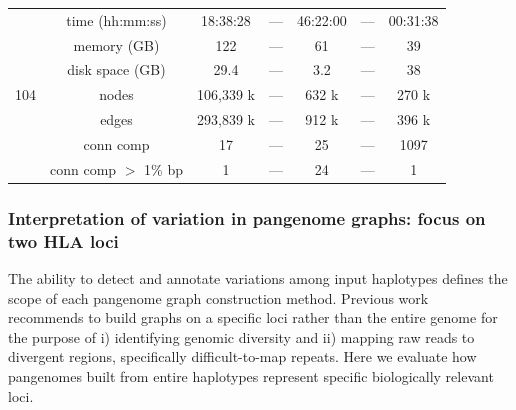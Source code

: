 \begin{table}
{\begin{tabular}{|c c c c c c c|}
			\hline\hline
			\multirow{7}{*}{104}  & time (hh:mm:ss)  &  18:38:28   &  ---  & 46:22:00  & --- & 00:31:38\\
			\cline{2-7}
			& memory (GB) & 122 &  ---  &  61 & --- & 39\\
			\cline{2-7}
			& disk space (GB)  &  29.4  & ---  &  3.2 & --- & 38\\
			\cline{2-7}
			&  nodes  & 106,339 k  &  ---  & 632 k & --- & 270 k\\
			\cline{2-7}
			&  edges  & 293,839 k  &  ---    & 912 k & --- & 396 k\\
			\cline{2-7}
			& conn comp   &  17  &   ---  & 25  & --- & 1097\\
			\cline{2-7}
			& conn comp $>$ 1\% bp &  1   & --- & 24 & --- & 1\\
			
			\hline
	\end{tabular}}
	\label{tab:computational_metrics}
\end{table}

\subsubsection*{\textbf{Interpretation of variation in pangenome graphs: focus on two HLA loci}}
\label{sec:loci}
The ability to detect and annotate variations among input haplotypes defines the scope of each pangenome graph construction method. Previous work~\cite{chin} recommends to build graphs on a specific loci rather than the entire genome for the purpose of i) identifying genomic diversity and ii) mapping raw reads to divergent regions, specifically difficult-to-map repeats. Here we evaluate how pangenomes built from entire haplotypes represent specific biologically relevant loci.

